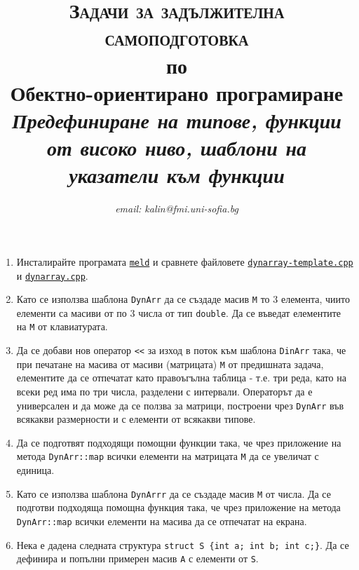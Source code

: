 \documentclass[12pt,a4paper]{article}
\author{\textit{email: kalin@fmi.uni-sofia.bg}}
\title{\textsc{Задачи за задължителна самоподготовка} \\
по \\
Обектно-ориентирано програмиране\\
\textit{Предефиниране на типове, функции от високо ниво, шаблони на указатели към функции}}
\begin{document}
\maketitle


\begin{enumerate}

\item Инсталирайте програмата \href{http://meldmerge.org/}{\texttt{meld}} и сравнете файловете \href{https://github.com/stranxter/lecture-notes/blob/master/samples/02_oop/2016/03_DynArray/dynarray-template.cpp}{\texttt{dynarray-template.cpp}} и \href{https://github.com/stranxter/lecture-notes/blob/master/samples/02_oop/2016/03_DynArray/dynarray.cpp}{\texttt{dynarray.cpp}}.

\item Като се използва шаблона \texttt{DynArr} да се създаде масив \texttt{M} то 3 елемента, чиито елементи са масиви от по 3 числа от тип \texttt{double}. Да се въведат елементите на \texttt{M} от клавиатурата. 

\item Да се добави нов оператор \texttt{<<} за изход в поток към шаблона \texttt{DinArr} така, че при печатане на масива от масиви (матрицата) \texttt{M} от предишната задача, елементите да се отпечатат като правоъгълна таблица - т.е. три реда, като на всеки ред има по три числа, разделени с интервали. Операторът да е универсален и да може да се ползва за матрици, построени чрез \texttt{DynArr} във всякакви размерности и с елементи от всякакви типове.

\item Да се подготвят подходящи помощни функции така, че чрез приложение на метода \texttt{DynArr::map} всички елементи на матрицата \texttt{M} да се увеличат с единица. 

\item Като се използва шаблона \texttt{DynArrr} да се създаде масив \texttt{M} от числа. Да се подготви подходяща помощна функция така, че чрез приложение на метода \texttt{DynArr::map} всички елементи на масива да се отпечатат на екрана.

\item Нека е дадена следната структура \texttt{struct S \{int a; int b; int c;\}}. Да се дефинира и попълни примерен масив \texttt{A} с елементи от  \texttt{S}.


\end{enumerate}
\end{document}
